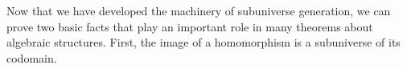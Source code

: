 Now that we have developed the machinery of subuniverse generation, we can prove two basic facts that play an important role in many theorems about algebraic structures. First, the image of a homomorphism is a subuniverse of its codomain.
\ccpad
\begin{code}%
\>[0][@{}l@{\AgdaIndent{1}}]%
\>[1]\AgdaSpace{}%
\AgdaSymbol{:}%
\>[652I]\AgdaSymbol{\{}\AgdaSpace{}%
\AgdaSymbol{:}\AgdaSpace{}%
\AgdaSpace{}%
\AgdaSpace{}%
\AgdaSymbol{\}\{}\AgdaSpace{}%
\AgdaSymbol{:}\AgdaSpace{}%
\AgdaSpace{}%
\AgdaSpace{}%
\AgdaSymbol{\}}\<%
\\
\>[.][@{}l@{}]\<[652I]%
\>[20]\AgdaSymbol{(}\AgdaSpace{}%
\AgdaSymbol{:}\AgdaSpace{}%
\AgdaSpace{}%
\AgdaSpace{}%
\AgdaSymbol{)}\AgdaSpace{}%
\AgdaSpace{}%
\AgdaSymbol{(}\AgdaSpace{}%
\AgdaSpace{}%
\AgdaSymbol{)}\AgdaSpace{}%
\AgdaSpace{}%
\AgdaSpace{}%
\<%
\\
%
\\[\AgdaEmptyExtraSkip]%
%
\>[1]\AgdaSpace{}%
\AgdaSymbol{\{}\AgdaSymbol{\}\{}\AgdaSymbol{\}}\AgdaSpace{}%
\AgdaSpace{}%
\AgdaSpace{}%
\AgdaSpace{}%
\AgdaSpace{}%
\AgdaSymbol{=}\AgdaSpace{}%
\AgdaSpace{}%
\AgdaSymbol{((}\AgdaSpace{}%
\AgdaSpace{}%
\AgdaSymbol{)}\AgdaSpace{}%
\AgdaSymbol{)}\AgdaSpace{}%
\AgdaSymbol{((}\AgdaSpace{}%
\AgdaSpace{}%
\AgdaSymbol{)}\AgdaSpace{}%
\AgdaSymbol{)}\AgdaSpace{}%
\<%
\\
\>[1][@{}l@{\AgdaIndent{0}}]%
\>[2]\<%
\\
%
\>[2]\AgdaSpace{}%
\AgdaSymbol{:}\AgdaSpace{}%
\AgdaSpace{}%
\AgdaSpace{}%
\AgdaSpace{}%
\AgdaSpace{}%
\AgdaSpace{}%
\AgdaSpace{}%
\AgdaSpace{}%
\<%
\\
%
\>[2]\AgdaSpace{}%
\AgdaSymbol{=}\AgdaSpace{}%

\end{code}
